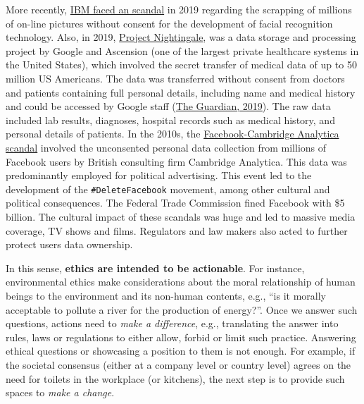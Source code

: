 \documentclass[
]{book}
\begin{document}
More recently, \href{https://www.nbcnews.com/tech/internet/facial-recognition-s-dirty-little-secret-millions-online-photos-scraped-n981921}{IBM faced an scandal} in 2019 regarding the scrapping of millions of on-line pictures without consent for the development of facial recognition technology. Also, in 2019, \href{https://en.wikipedia.org/wiki/Project_Nightingale}{Project Nightingale}, was a data storage and processing project by Google and Ascension (one of the largest private healthcare systems in the United States), which involved the secret transfer of medical data of up to 50 million US Americans. The data was transferred without consent from doctors and patients containing full personal details, including name and medical history and could be accessed by Google staff (\href{https://www.theguardian.com/technology/2019/nov/12/google-medical-data-project-nightingale-secret-transfer-us-health-information}{The Guardian, 2019}). The raw data included lab results, diagnoses, hospital records such as medical history, and personal details of patients. In the 2010s, the \href{https://en.wikipedia.org/wiki/Facebook\%E2\%80\%93Cambridge_Analytica_data_scandal}{Facebook-Cambridge Analytica scandal} involved the unconsented personal data collection from millions of Facebook users by British consulting firm Cambridge Analytica. This data was predominantly employed for political advertising. This event led to the development of the \texttt{\#DeleteFacebook} movement, among other cultural and political consequences. The Federal Trade Commission fined Facebook with \$5 billion. The cultural impact of these scandals was huge and led to massive media coverage, TV shows and films. Regulators and law makers also acted to further protect users data ownership.

In this sense, \textbf{ethics are intended to be actionable}. For instance, environmental ethics \citep{sep-ethics-environmental} make considerations about the moral relationship of human beings to the environment and its non-human contents, e.g., ``is it morally acceptable to pollute a river for the production of energy?''. Once we answer such questions, actions need to \emph{make a difference}, e.g., translating the answer into rules, laws or regulations to either allow, forbid or limit such practice. Answering ethical questions or showcasing a position to them is not enough. For example, if the societal consensus (either at a company level or country level) agrees on the need for toilets in the workplace (or kitchens), the next step is to provide such spaces to \emph{make a change}.
\end{document}
